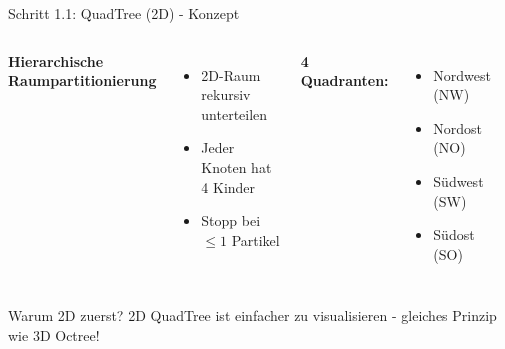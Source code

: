 \documentclass[xcolor=dvipsnames]{beamer}
\begin{document}
\begin{frame}{Schritt 1.1: QuadTree (2D) - Konzept}
\begin{columns}
\textbf{Hierarchische Raumpartitionierung}
\begin{itemize}
    \item 2D-Raum rekursiv unterteilen
    \item Jeder Knoten hat 4 Kinder
    \item Stopp bei $\leq 1$ Partikel
\end{itemize}

\vspace{0.3cm}
\textbf{4 Quadranten:}
\begin{itemize}
    \item Nordwest (NW)
    \item Nordost (NO)
    \item Südwest (SW)
    \item Südost (SO)
\end{itemize}

\begin{center}
\end{center}
\end{columns}

\begin{exampleblock}{Warum 2D zuerst?}
2D QuadTree ist einfacher zu visualisieren - gleiches Prinzip wie 3D Octree!
\end{exampleblock}
\end{frame}
\end{document}
